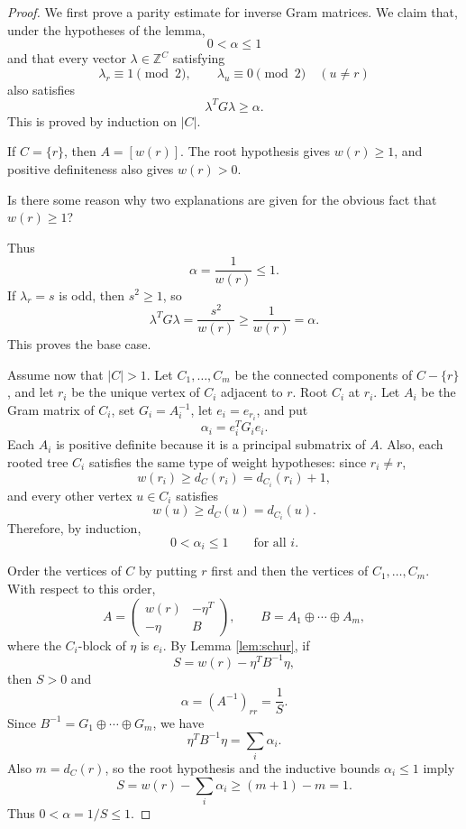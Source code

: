 \documentclass[12pt]{article}
\newcommand{\Z}{\mathbb{Z}}
\newcommand{\review}[1]{\begin{reviewbox}#1\end{reviewbox}}
\begin{document}
\begin{proof}
We first prove a parity estimate for inverse Gram matrices. We claim that, under the hypotheses of the lemma,
\[
0<\alpha\le 1
\]
and that every vector \(\lambda\in\Z^C\) satisfying
\[
\lambda_r\equiv 1\pmod 2,
\qquad
\lambda_u\equiv 0\pmod 2\quad(u\ne r)
\]
also satisfies
\[
\lambda^T G\lambda\ge \alpha.
\]
This is proved by induction on \(|C|\).

If \(C=\{r\}\), then \(A=[w(r)]\). The root hypothesis gives \(w(r)\ge 1\), and positive definiteness also gives \(w(r)>0\). 
\review{Is there some reason why two explanations are given for the obvious fact that $w(r)\ge 1$?}
Thus
\[
\alpha=\frac{1}{w(r)}\le 1.
\]
If \(\lambda_r=s\) is odd, then \(s^2\ge 1\), so
\[
\lambda^TG\lambda=\frac{s^2}{w(r)}\ge \frac{1}{w(r)}=\alpha.
\]
This proves the base case.

Assume now that \(|C|>1\). Let \(C_1,\dots,C_m\) be the connected components of \(C-\{r\}\), and let \(r_i\) be the unique vertex of \(C_i\) adjacent to \(r\). Root \(C_i\) at \(r_i\). Let \(A_i\) be the Gram matrix of \(C_i\), set \(G_i=A_i^{-1}\), let \(e_i=e_{r_i}\), and put
\[
\alpha_i=e_i^TG_ie_i.
\]
Each \(A_i\) is positive definite because it is a principal submatrix of \(A\). Also, each rooted tree \(C_i\) satisfies the same type of weight hypotheses: since \(r_i\ne r\),
\[
w(r_i)\ge d_C(r_i)=d_{C_i}(r_i)+1,
\]
and every other vertex \(u\in C_i\) satisfies
\[
w(u)\ge d_C(u)=d_{C_i}(u).
\]
Therefore, by induction,
\[
0<\alpha_i\le 1
\qquad\text{for all }i.
\]

Order the vertices of \(C\) by putting \(r\) first and then the vertices of \(C_1,\dots,C_m\). With respect to this order,
\[
A=
\begin{pmatrix}
w(r) & -\eta^T\\
-\eta & B
\end{pmatrix},
\qquad
B=A_1\oplus\cdots\oplus A_m,
\]
where the \(C_i\)-block of \(\eta\) is \(e_i\). By Lemma \ref{lem:schur}, if
\[
S=w(r)-\eta^TB^{-1}\eta,
\]
then \(S>0\) and
\[
\alpha=(A^{-1})_{rr}=\frac{1}{S}.
\]
Since \(B^{-1}=G_1\oplus\cdots\oplus G_m\), we have
\[
\eta^TB^{-1}\eta=\sum_i \alpha_i.
\]
Also \(m=d_C(r)\), so the root hypothesis and the inductive bounds \(\alpha_i\le 1\) imply
\[
S=w(r)-\sum_i\alpha_i
\ge (m+1)-m
=1.
\]
Thus \(0<\alpha=1/S\le 1\).


\end{proof}
\end{document}
